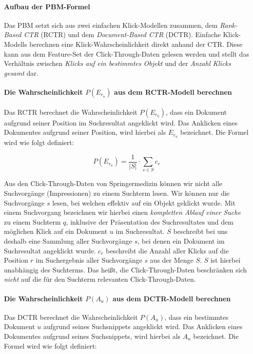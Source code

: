 \paragraph{Aufbau der PBM-Formel}
Das PBM setzt sich aus zwei einfachen Klick-Modellen zusammen, dem \textit{Rank-Based CTR} (RCTR) und dem \textit{Document-Based CTR} (DCTR). Einfache Klick-Modells berechnen eine Klick-Wahrscheinlichkeit direkt anhand der CTR. Diese kann aus dem Feature-Set der Click-Through-Daten gelesen werden und stellt das Verhältnis zwischen \textit{Klicks auf ein bestimmtes Objekt} und der \textit{Anzahl Klicks gesamt} dar. 

\paragraph{Die Wahrscheinlichkeit $P(E_{r_{u}})$ aus dem RCTR-Modell berechnen}
Das RCTR berechnet die Wahrscheinlichkeit $P(E_{r_{u}})$, dass ein Dokument aufgrund seiner Position im Suchresultat angeklickt wird. Das Anklicken eines Dokumentes aufgrund seiner Position, wird hierbei als $E_{r_{u}}$ bezeichnet. Die Formel wird wie folgt definiert:

\vspace{-1.5em}
\begin{equation}	
	P(E_{r_{u}}) = \frac{1}{\vert S \vert} \cdot \sum\limits_{s \in S}{c_r}
\end{equation}
\vspace{-1em}

Aus den Click-Through-Daten von Springermedizin können wir nicht alle Suchvorgänge (Impressionen) zu einem Suchterm lesen. Wir können nur die Suchvorgänge $s$ lesen, bei welchen effektiv auf ein Objekt geklickt wurde. Mit einem Suchvorgang bezeichnen wir hierbei einen \textit{kompletten Ablauf einer Suche} zu einem Suchterm $q$, inklusive der Präsentation des Suchresultates und dem möglichen Klick auf ein Dokument $u$ im Suchresultat. $S$ beschreibt bei uns deshalb eine Sammlung aller Suchvorgänge $s$, bei denen ein Dokument im Suchresultat angeklickt wurde. $c_r$ beschreibt die Anzahl aller Klicks auf die Position $r$ im Suchergebnis aller Suchvorgänge $s$ aus der Menge $S$. $S$ ist hierbei unabhängig des Suchterms. Das heißt, die Click-Through-Daten beschränken sich \textit{nicht} auf die für den Suchterm relevanten Click-Through-Daten.  

\paragraph{Die Wahrscheinlichkeit $P(A_{u})$ aus dem DCTR-Modell berechnen}
Das DCTR berechnet die Wahrscheinlichkeit $P(A_{u})$, dass ein bestimmtes Dokument $u$ aufgrund seines Suchsnippets angeklickt wird. Das Anklicken eines Dokumentes aufgrund seines Suchsnippets, wird hierbei als $A_{u}$ bezeichnet. Die Formel wird wie folgt definiert:

